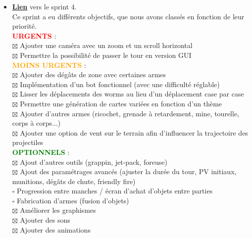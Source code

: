 \documentclass[a4paper, 12pt]{article}
\newcommand{\CheckBo}[1]{$\boxtimes$ #1}
\newcommand{\TodoBo}[1]{$\square$ #1}
\begin{document}
\begin{itemize}[itemsep=1cm]
            \subsection{Sprint 4 : Dernière release (29/12 - 12/01)}
                \item \href{https://moule.informatique.u-paris.fr/mesnildr/projet-worms/-/milestones/6#tab-issues}{\textbf{Lien}} vers le sprint 4.\\
                Ce sprint a eu différents objectifs, que nous avons classés en fonction de leur priorité.\\
                \newline
                \textcolor{red}{\textbf{URGENTS}} :\\
                    \CheckBo{Ajouter une caméra avec un zoom et un scroll horizontal}\\
                    \CheckBo{Permettre la possibilité de passer le tour en version GUI}\\
                
                \textcolor{orange}{\textbf{MOINS URGENTS}} :\\
                    \CheckBo{Ajouter des dégâts de zone avec certaines armes}\\
                    \CheckBo{Implémentation d'un bot fonctionnel (avec une difficulté réglable)}\\
                    \CheckBo{Lisser les déplacements des worms au lieu d'un déplacement case par case}\\
                    \CheckBo{Permettre une génération de cartes variées en fonction d'un thème}\\
                    \CheckBo{Ajouter d'autres armes (ricochet, grenade à retardement, mine, tourelle, corps à corps...)}\\
                    \CheckBo{Ajouter une option de vent sur le terrain afin d'influencer la trajectoire des projectiles}\\
                
                \textcolor{green}{\textbf{OPTIONNELS}} :\\
                    \CheckBo{Ajout d'autres outils (grappin, jet-pack, foreuse)}\\
                    \CheckBo{Ajout des paramétrages avancés (ajuster la durée du tour, PV initiaux, munitions, dégâts de chute, friendly fire)}\\
                    \TodoBo{Progression entre manches / écran d'achat d'objets entre parties}\\
                    \TodoBo{Fabrication d'armes (fusion d'objets)}\\
                    \CheckBo{Améliorer les graphismes}\\
                    \CheckBo{Ajouter des sons}\\
                    \CheckBo{Ajouter des animations}
                \newline


\end{itemize}
\end{document}
